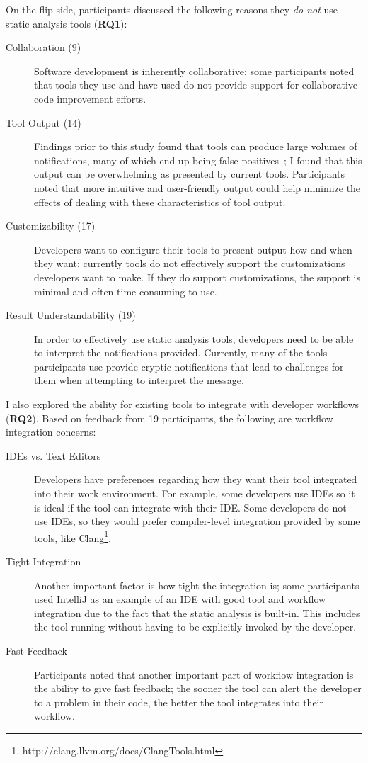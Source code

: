 \documentclass{llncs}
\begin{document}
On the flip side, participants discussed the following reasons they \emph{do not} use static analysis tools (\textbf{RQ1}): 
\begin{description}
		\item [Collaboration (9)] Software development is inherently collaborative; some participants noted that tools they use and have used do not provide support for collaborative code improvement efforts.
		\item [Tool Output (14)] Findings prior to this study found that tools can produce large volumes of notifications, many of which end up being false positives~\cite{Ayewah:2010:GFF,Shen:2011:EFindBugs}; I found that this output can be overwhelming as presented by current tools. Participants noted that more intuitive and user-friendly output could help minimize the effects of dealing with these characteristics of tool output.
		\item [Customizability (17)] Developers want to configure their tools to present output how and when they want; currently tools do not effectively support the customizations developers want to make. If they do support customizations, the support is minimal and often time-consuming to use.
		\item [Result Understandability (19)] In order to effectively use static analysis tools, developers need to be able to interpret the notifications provided. Currently, many of the tools participants use provide cryptic notifications that lead to challenges for them when attempting to interpret the message.
\end{description}

I also explored the ability for existing tools to integrate with developer workflows (\textbf{RQ2}). Based on feedback from 19 participants, the following are workflow integration concerns:
\begin{description}
	\item[IDEs vs. Text Editors] Developers have preferences regarding how they want their tool integrated into their work environment. For example, some developers use IDEs so it is ideal if the tool can integrate with their IDE. Some developers do not use IDEs, so they would prefer compiler-level integration provided by some tools, like Clang\footnote{http://clang.llvm.org/docs/ClangTools.html}.
	\item[Tight Integration] Another important factor is how tight the integration is; some participants used IntelliJ as an example of an IDE with good tool and workflow integration due to the fact that the static analysis is built-in. This includes the tool running without having to be explicitly invoked by the developer.
	\item [Fast Feedback] Participants noted that another important part of workflow integration is the ability to give fast feedback; the sooner the tool can alert the developer to a problem in their code, the better the tool integrates into their workflow.
\end{description}
\end{document}
